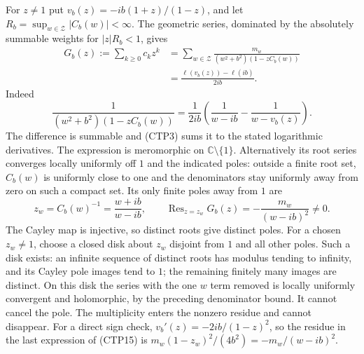 For $z\ne1$ put $v_b(z)=-ib(1+z)/(1-z)$, and let
$R_b=\sup_{w\in\mathcal Z}|C_b(w)|<\infty$. The geometric series,
dominated by the absolutely summable weights for $|z|R_b<1$, gives
\begin{equation}\tag{CTP15}
\begin{split}
 G_b(z):=\sum_{k\ge0}c_kz^k
 &=\sum_{w\in\mathcal Z}
   \frac{m_w}{(w^2+b^2)(1-zC_b(w))}\\
 &=\frac{\ell(v_b(z))-\ell(ib)}{2ib}.
\end{split}
\end{equation}
Indeed
\[
 \frac1{(w^2+b^2)(1-zC_b(w))}
 =\frac1{2ib}\left(\frac1{w-ib}-\frac1{w-v_b(z)}\right).
\]
The difference is summable and (CTP3) sums it to the stated
logarithmic derivatives. The expression is meromorphic on
$\mathbb C\setminus\{1\}$. Alternatively its root series converges
locally uniformly off $1$ and the indicated poles: outside a finite
root set, $C_b(w)$ is uniformly close to one and the denominators
stay uniformly away from zero on such a compact set. Its only
finite poles away from $1$ are
\begin{equation}\tag{CTP16}
 z_w=C_b(w)^{-1}=\frac{w+ib}{w-ib},\qquad
 \operatorname{Res}_{z=z_w}G_b(z)=-\frac{m_w}{(w-ib)^2}\ne0.
\end{equation}
The Cayley map is injective, so distinct roots give distinct poles.
For a chosen $z_w\ne1$, choose a closed disk about $z_w$ disjoint
from $1$ and all other poles. Such a disk exists: an infinite
sequence of distinct roots has modulus tending to infinity, and
its Cayley pole images tend to $1$; the remaining finitely many
images are distinct. On this disk the series with the one $w$
term removed is locally uniformly convergent and holomorphic,
by the preceding denominator bound. It cannot cancel the pole.
The multiplicity enters the nonzero residue and cannot disappear.
For a direct sign check, $v_b'(z)=-2ib/(1-z)^2$, so the residue in
the last expression of (CTP15) is
$m_w(1-z_w)^2/(4b^2)=-m_w/(w-ib)^2$.

